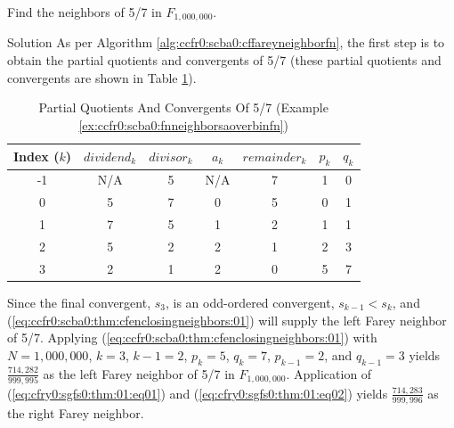 \begin{vworkexamplestatement}
\label{ex:ccfr0:scba0:fnneighborsaoverbinfn}
Find the neighbors of 5/7 in $F_{1,000,000}$.
\end{vworkexamplestatement}
\begin{vworkexampleparsection}{Solution}
As per Algorithm \ref{alg:ccfr0:scba0:cffareyneighborfn}, the first
step is to obtain the partial quotients and convergents of 5/7
(these partial quotients and convergents are shown in
Table \ref{tbl:ex:ccfr0:scba0:fnneighborsaoverbinfn}).

\begin{table}
\caption{Partial Quotients And Convergents Of 5/7 
		 (Example \ref{ex:ccfr0:scba0:fnneighborsaoverbinfn})}
\label{tbl:ex:ccfr0:scba0:fnneighborsaoverbinfn}
\begin{center}
\begin{tabular}{|c|c|c|c|c|c|c|}
\hline
\small{Index ($k$)} & \small{$dividend_k$}  & \small{$divisor_k$} & \small{$a_k$}   & \small{$remainder_k$} & \small{$p_k$}    & \small{$q_k$}  \\
\hline
\hline
\small{-1}    & \small{N/A}           & \small{5}           & \small{N/A}     & \small{7}             & \small{1}        & \small{0}      \\
\hline
\small{0}     & \small{5}             & \small{7}           & \small{0}       & \small{5}             & \small{0}        & \small{1}      \\
\hline
\small{1}     & \small{7}             & \small{5}           & \small{1}       & \small{2}             & \small{1}        & \small{1}      \\ 
\hline
\small{2}     & \small{5}             & \small{2}           & \small{2}       & \small{1}             & \small{2}        & \small{3}      \\ 
\hline
\small{3}     & \small{2}             & \small{1}           & \small{2}       & \small{0}             & \small{5}        & \small{7}      \\
\hline
\end{tabular}
\end{center}
\end{table}

Since the final convergent, $s_{3}$, is an odd-ordered convergent, $s_{k-1} < s_k$, and
(\ref{eq:ccfr0:scba0:thm:cfenclosingneighbors:01}) will supply the left Farey neighbor
of 5/7.  Applying (\ref{eq:ccfr0:scba0:thm:cfenclosingneighbors:01}) with
$N=1,000,000$, $k=3$, $k-1=2$, $p_k = 5$, $q_k = 7$, $p_{k-1}=2$, and $q_{k-1}=3$
yields $\frac{714,282}{999,995}$ as the left Farey neighbor of 5/7 in $F_{1,000,000}$.
Application of (\cfryzeroxrefhyphen{}\ref{eq:cfry0:sgfs0:thm:01:eq01}) 
and (\cfryzeroxrefhyphen{}\ref{eq:cfry0:sgfs0:thm:01:eq02})  
yields $\frac{714,283}{999,996}$ as the right Farey neighbor.
\end{vworkexampleparsection}


